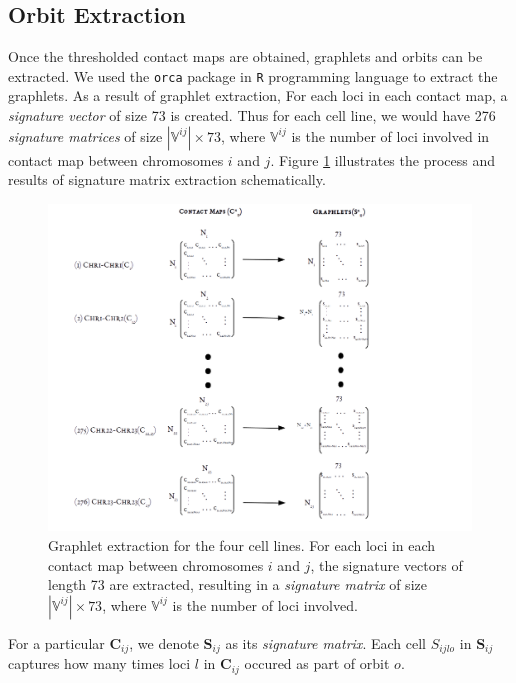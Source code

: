 \documentclass[a4,center,fleqn]{NAR}
\begin{document}
\subsection{Orbit Extraction}
Once the thresholded contact maps are obtained, graphlets and orbits can be 
extracted. We used the \texttt{orca} package in \texttt{R} programming 
language to extract the graphlets. As a result of graphlet extraction, 
For each loci in each contact map, a \textit{signature vector} of size
73 is created. Thus for each cell line, we would have 276 
\textit{signature matrices} of
size $|\mathbb{V}^{ij}|\times 73$, where $\mathbb{V}^{ij}$ is the number of loci
involved in contact map between chromosomes $i$ and $j$. Figure
\ref{fig:graphlet_extraction} illustrates the process and results
of signature matrix extraction schematically.
\begin{figure}
    \centering
    \includegraphics[width=.5\textwidth]{figures/graphlet_extraction.png}
    \caption{Graphlet extraction for the four cell lines. For each
    loci in each contact map between chromosomes $i$ and $j$, 
    the signature vectors of length 73 are extracted, resulting 
    in a \textit{signature matrix} of size $|\mathbb{V}^{ij}| \times 73$,
    where $\mathbb{V}^{ij}$ 
    is the number of loci involved.}
    \label{fig:graphlet_extraction}
\end{figure}

For a particular
$\mathbf{C}_{ij}$, we denote $\mathbf{S}_{ij}$ as its \textit{signature 
matrix}. Each cell $S_{ijlo}$ in $\mathbf{S}_{ij}$ captures how many
times loci $l$ in $\mathbf{C}_{ij}$ occured as part of orbit $o$.
\end{document}
